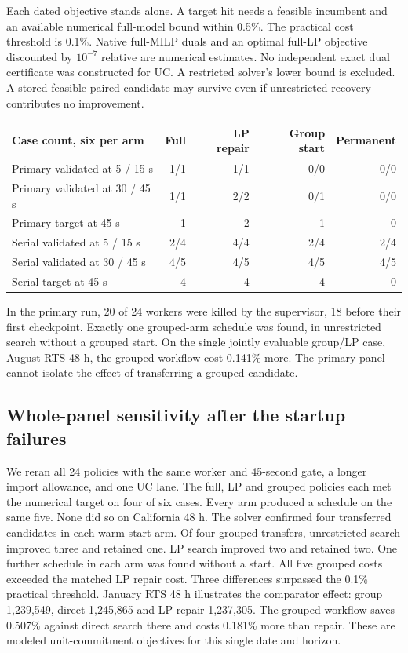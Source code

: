 \documentclass[10pt,letterpaper]{article}
\newcommand{\sub}[1]{\subsection*{\color{accent}#1}}
\begin{document}
Each dated objective stands alone. A target hit needs a feasible incumbent and an available numerical full-model bound within 0.5\%. The practical cost threshold is 0.1\%. Native full-MILP duals and an optimal full-LP objective discounted by $10^{-7}$ relative are numerical estimates. No independent exact dual certificate was constructed for UC. A restricted solver's lower bound is excluded. A stored feasible paired candidate may survive even if unrestricted recovery contributes no improvement.
\begin{center}\small
\begin{tabular}{@{}lrrrr@{}}
\toprule
Case count, six per arm & Full & LP repair & Group start & Permanent\\\midrule
Primary validated at 5 / 15 s &1/1&1/1&0/0&0/0\\
Primary validated at 30 / 45 s &1/1&2/2&0/1&0/0\\
Primary target at 45 s &1&2&1&0\\
Serial validated at 5 / 15 s &2/4&4/4&2/4&2/4\\
Serial validated at 30 / 45 s &4/5&4/5&4/5&4/5\\
Serial target at 45 s &4&4&4&0\\\bottomrule
\end{tabular}
\end{center}
In the primary run, 20 of 24 workers were killed by the supervisor, 18 before their first checkpoint. Exactly one grouped-arm schedule was found, in unrestricted search without a grouped start. On the single jointly evaluable group/LP case, August RTS 48 h, the grouped workflow cost 0.141\% more. The primary panel cannot isolate the effect of transferring a grouped candidate.

\sub{Whole-panel sensitivity after the startup failures}
We reran all 24 policies with the same worker and 45-second gate, a longer import allowance, and one UC lane. The full, LP and grouped policies each met the numerical target on four of six cases. Every arm produced a schedule on the same five. None did so on California 48 h. The solver confirmed four transferred candidates in each warm-start arm. Of four grouped transfers, unrestricted search improved three and retained one. LP search improved two and retained two. One further schedule in each arm was found without a start. All five grouped costs exceeded the matched LP repair cost. Three differences surpassed the 0.1\% practical threshold. January RTS 48 h illustrates the comparator effect: group 1,239,549, direct 1,245,865 and LP repair 1,237,305. The grouped workflow saves 0.507\% against direct search there and costs 0.181\% more than repair. These are modeled unit-commitment objectives for this single date and horizon.
\end{document}
